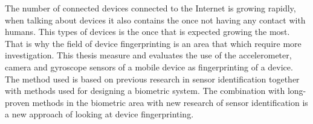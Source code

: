 The number of connected devices connected to the Internet is growing rapidly, when talking about devices it also contains the once not having any contact with humans. This types of devices is the once that is expected growing the most. That is why the field of device fingerprinting is an area that which require more investigation. This thesis measure and evaluates the use of the accelerometer, camera and gyroscope sensors of a mobile device as fingerprinting of a device. The method used is based on previous research in sensor identification together with methods used for designing a biometric system. The combination with long-proven methods in the biometric area with new research of sensor identification is a new approach of looking at device fingerprinting.
